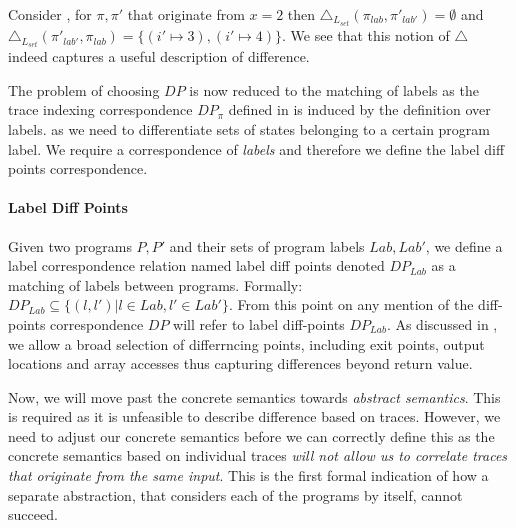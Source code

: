 
\begin{Example}
Consider , for $\pi, \pi'$ that originate from $x=2$  then $\triangle_{L_{set}}(\pi_{lab},\pi'_{lab'}) = \emptyset$ and $\triangle_{L_{set}}(\pi'_{lab'},\pi_{lab}) = \{ (i' \mapsto 3),(i' \mapsto 4) \}$. We see that this notion of $\triangle$ indeed captures a useful description of difference.
\end{Example} 

The problem of choosing $DP$ is now reduced to the matching of labels as the trace indexing correspondence $DP_{\pi}$ defined in  is induced by the definition over labels. as we need to differentiate sets of states belonging to a certain program label. We require a correspondence of \emph{labels} and therefore we define the label diff points correspondence.

\paragraph{Label Diff Points} 
Given two programs $P,P'$ and their sets of program labels $Lab,Lab'$, we define a label correspondence relation named label diff points denoted $DP_{Lab}$ as a matching of labels between programs. Formally: $DP_{Lab} \subseteq \{(l,l')|l \in Lab, l' \in Lab'\}$. From this point on any mention of the diff-points correspondence $DP$ will refer to label diff-points $DP_{Lab}$. As discussed in , we allow a broad selection of differrncing points, including exit points, output locations and array accesses thus capturing differences beyond return value. %

Now, we will move past the concrete semantics towards \emph{abstract semantics}. This is required as it is unfeasible to describe difference based on traces. However, we need to adjust our concrete semantics before we can correctly define this as the concrete semantics based on individual traces \emph{will not allow us to correlate traces that originate from the same input}. This is the first formal indication of how a separate abstraction, that considers each of the programs by itself, cannot succeed.

